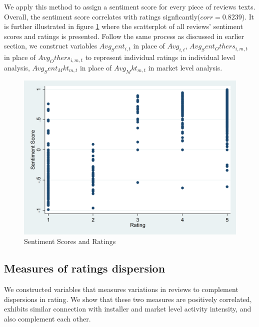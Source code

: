 \documentclass[msom,blindrev]{informs3}
\begin{document}
We apply this method to assign a sentiment score for every piece of reviews texts. Overall, the sentiment score correlates with ratings signficantly($corr = 0.8239$). It is further illustrated in figure \ref{sent_score_scatter} where the scatterplot of all reviews' sentiment scores and ratings is presented.  Follow the same process as discussed in earlier section, we construct variables $Avg_Sent_{i,t}$ in place of $Avg_{i,t}$, $Avg_Sent_Others_{i,m,t}$ in place of $Avg_Others_{i,m,t}$ to represent individual ratings in individual level analysis, $Avg_Sent_Mkt_{m,t}$ in place of $Avg_Mkt_{m,t}$ in market level analysis.  
\begin{figure}
	\centering
	\includegraphics[width=0.7\linewidth]{sent_score_scatter.png}
	\caption{Sentiment Scores and Ratings}
	\label{sent_score_scatter}
\end{figure}
\subsection{Measures of ratings dispersion}
 We constructed variables that measures variations in reviews to complement dispersions in rating. We show that these two measures are positively correlated, exhibits similar connection with installer and market level activity intensity, and also complement each other. 
\end{document}
